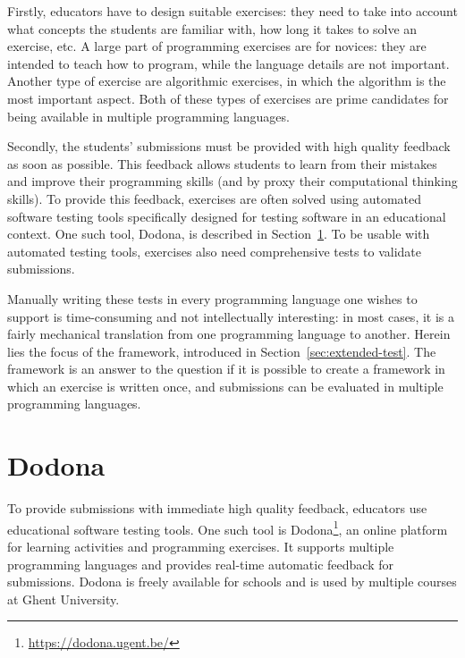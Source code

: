 \documentclass[5p,number]{elsarticle}
\begin{document}
    Firstly, educators have to design suitable exercises: they need to take into account what concepts the students are familiar with, how long it takes to solve an exercise, etc.
    A large part of programming exercises are for novices: they are intended to teach how to program, while the language details are not important.
    Another type of exercise are algorithmic exercises, in which the algorithm is the most important aspect.
    Both of these types of exercises are prime candidates for being available in multiple programming languages.
    
    Secondly, the students' submissions must be provided with high quality feedback as soon as possible.
    This feedback allows students to learn from their mistakes and improve their programming skills (and by proxy their computational thinking skills).
    To provide this feedback, exercises are often solved using automated software testing tools specifically designed for testing software in an educational context.
    One such tool, Dodona, is described in Section~\ref{sec:extended-dodona}.
    To be usable with automated testing tools, exercises also need comprehensive tests to validate submissions.
    
    Manually writing these tests in every programming language one wishes to support is time-consuming and not intellectually interesting: in most cases, it is a fairly mechanical translation from one programming language to another.
    Herein lies the focus of the \tested{} framework, introduced in Section~\ref{sec:extended-test}.
    The framework is an answer to the question if it is possible to create a framework in which an exercise is written once, and submissions can be evaluated in multiple programming languages.

    \section{Dodona}\label{sec:extended-dodona}
    
    To provide submissions with immediate high quality feedback, educators use educational software testing tools.
    One such tool is Dodona\footnote{\url{https://dodona.ugent.be/}}, an online platform for learning activities and programming exercises.
    It supports multiple programming languages and provides real-time automatic feedback for submissions.
    Dodona is freely available for schools and is used by multiple courses at Ghent University.
\end{document}
